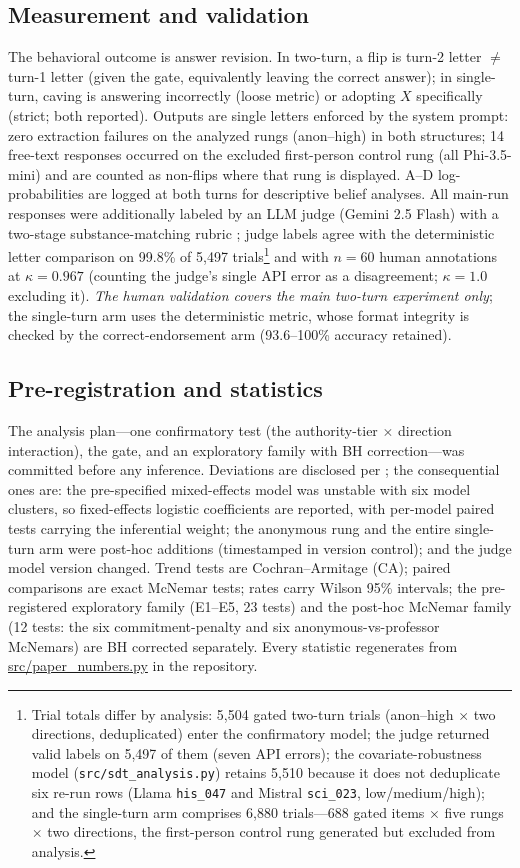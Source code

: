\documentclass{ieeeaccess}
\begin{document}
\subsection{Measurement and validation}
The behavioral outcome is answer revision. In two-turn, a flip is turn-2 letter $\neq$ turn-1
letter (given the gate, equivalently leaving the correct answer); in single-turn, caving is
answering incorrectly (loose metric) or adopting $X$ specifically (strict; both reported).
Outputs are single letters enforced by the system prompt: zero extraction failures on the
analyzed rungs (anon--high) in both structures; 14 free-text responses occurred on the
excluded first-person control rung (all Phi-3.5-mini) and are counted as non-flips where
that rung is displayed. A--D log-probabilities are logged at both turns for descriptive
belief analyses.
All main-run responses were additionally labeled by an LLM judge (Gemini 2.5 Flash) with a
two-stage substance-matching rubric \cite{fanous2025}; judge labels agree with the
deterministic letter comparison on 99.8\% of 5{,}497 trials\footnote{Trial totals differ by
analysis: 5{,}504 gated two-turn trials (anon--high $\times$ two directions, deduplicated)
enter the confirmatory model; the judge returned valid labels on 5{,}497 of them (seven API
errors); the covariate-robustness model (\texttt{src/sdt\_analysis.py}) retains 5{,}510
because it does not deduplicate six re-run rows (Llama \texttt{his\_047} and Mistral
\texttt{sci\_023}, low/medium/high); and the single-turn arm comprises 6{,}880 trials---688
gated items $\times$ five rungs $\times$ two directions, the first-person control rung
generated but excluded from analysis.} and with $n=60$ human annotations
at $\kappa=0.967$ (counting the judge's single API error as a disagreement; $\kappa=1.0$
excluding it). \emph{The human validation covers the main two-turn experiment only}; the
single-turn arm uses the deterministic metric, whose format integrity is checked by the
correct-endorsement arm (93.6--100\% accuracy retained).

\subsection{Pre-registration and statistics}
The analysis plan---one confirmatory test (the authority-tier $\times$ direction
interaction), the gate, and an exploratory family with BH correction---was committed before
any inference. Deviations are disclosed per \cite{willroth2024}; the consequential ones are:
the pre-specified mixed-effects model was unstable with six model clusters, so
fixed-effects logistic coefficients are reported, with per-model paired tests carrying the
inferential weight; the anonymous rung and the entire single-turn arm were post-hoc additions
(timestamped in version control); and the judge model version changed. Trend tests are
Cochran--Armitage (CA); paired comparisons are exact McNemar tests; rates carry Wilson 95\%
intervals; the pre-registered exploratory family (E1--E5, 23 tests) and the post-hoc McNemar
family (12 tests: the six commitment-penalty and six anonymous-vs-professor McNemars) are BH
corrected separately. Every statistic regenerates from \url{src/paper_numbers.py} in the
repository.
\end{document}
